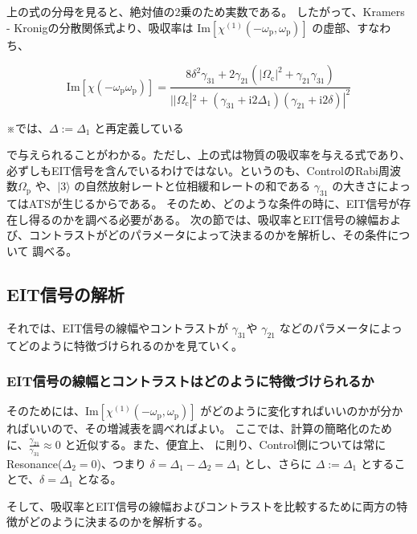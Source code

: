 \documentclass[11pt,a4paper]{ltjsarticle}
\begin{document}
上の式の分母を見ると、絶対値の2乗のため実数である。
したがって、Kramers - Kronigの分散関係式より、吸収率は $\mathrm{Im} \left[\chi^{\left( 1 \right)}(- \omega_{\mathrm{p}},\omega_{\mathrm{p}}) \right]$ 
の虚部、すなわち、

\begin{equation*}
  \mathrm{Im} [\chi \left( - \omega_{\mathrm{p}} \omega_{\mathrm{p}} \right)] = 
    \frac{8 \delta^2 \gamma_{31} + 2 \gamma_{21} \left( |\Omega_{\mathrm{c}}|^2 + \gamma_{21} \gamma_{31} \right) }{ {| |\Omega_{\mathrm{c}}|^2 + \left(\gamma_{31} + \mathrm{i} 2 \Delta_{1} \right) \left( \gamma_{21} + \mathrm{i} 2 \delta \right)| }^2} 
\end{equation*}

{\color{red}※\cite{Theory_of_EIT}では、$\Delta := \Delta_{1} $ と再定義している}


で与えられることがわかる。ただし、上の式は物質の吸収率を与える式であり、必ずしもEIT信号を含んでいるわけではない。というのも、ControlのRabi周波数$\Omega_{\mathrm{p}}$
や、$| 3 \rangle$ の自然放射レートと位相緩和レートの和である $\gamma_{31}$ の大きさによってはATSが生じるからである。
そのため、どのような条件の時に、EIT信号が存在し得るのかを調べる必要がある。
次の節では、吸収率とEIT信号の線幅および、コントラストがどのパラメータによって決まるのかを解析し、その条件について
調べる。


\subsection{EIT信号の解析}


それでは、EIT信号の線幅やコントラストが $\gamma_{31}$や $\gamma_{21}$ などのパラメータによってどのように特徴づけられるのかを見ていく。


\subsubsection{EIT信号の線幅とコントラストはどのように特徴づけられるか}
そのためには、$\mathrm{Im} \left[\chi^{\left( 1 \right)}(- \omega_{\mathrm{p}},\omega_{\mathrm{p}}) \right]$ 
がどのように変化すればいいのかが分かればいいので、その増減表を調べればよい。
ここでは、計算の簡略化のために、$\frac{\gamma_{21}}{\gamma_{31}} \approx 0$ と近似する。また、便宜上、\cite{Theory_of_EIT}
に則り、Control側については常にResonance($\Delta_{2} = 0$)、つまり $\delta = \Delta_{1} - \Delta_{2} = \Delta_{1}$ とし、さらに
$\Delta := \Delta_{1}$ とすることで、$\delta = \Delta_{1}$ となる。

そして、吸収率とEIT信号の線幅およびコントラストを比較するために両方の特徴がどのように決まるのかを解析する。
\end{document}

